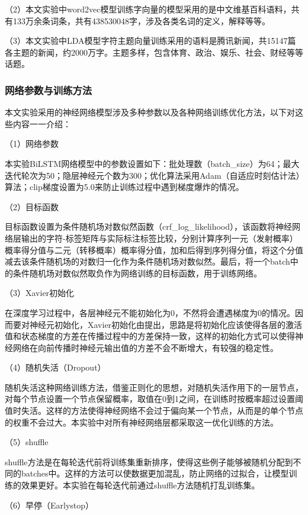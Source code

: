 \documentclass[winfonts,master,oneside,nobackinfo]{njuthesis}
\begin{document}
（2）本文实验中word2vec模型训练字向量的模型采用的是中文维基百科语料，共有133万余条词条，共有438530048字，涉及各类名词的定义，解释等等。

（3）本文实验中LDA模型字符主题向量训练采用的语料是腾讯新闻，共15147篇各主题的新闻，约2000万字。主题多样，包含体育、政治、娱乐、社会、财经等等话题。

\subsubsection{网络参数与训练方法}

本文实验采用的神经网络模型涉及多种参数以及各种网络训练优化方法，以下对这些内容一一介绍：

（1）网络参数

本实验BiLSTM网络模型中的参数设置如下：批处理数（batch\_size）为64；最大迭代轮次为50；隐层神经元个数为300；优化算法采用Adam\cite{Adam}（自适应时刻估计法）算法；clip梯度设置为5.0来防止训练过程中遇到梯度爆炸的情况。

（2）目标函数

目标函数设置为条件随机场对数似然函数（crf\_log\_likelihood），该函数将神经网络层输出的字符-标签矩阵与实际标注标签比较，分别计算序列一元（发射概率）概率得分值与二元（转移概率）概率得分值，加和后得到序列得分值，将这个分值减去该条件随机场的对数归一化作为条件随机场对数似然。最后，将一个batch中的条件随机场对数似然取负作为网络训练的目标函数，用于训练网络。

（3）Xavier初始化

在深度学习过程中，各层神经元不能初始化为0，不然将会遭遇梯度为0的情况。因而要对神经元初始化，Xavier初始化由\cite{Glorot}提出，思路是将初始化应该使得各层的激活值和状态梯度的方差在传播过程中的方差保持一致，这样的初始化方式可以使得神经网络在向前传播时神经元输出值的方差不会不断增大，有较强的稳定性。

（4）随机失活（Dropout）

随机失活这种网络训练方法，借鉴正则化的思想，对随机失活作用下的一层节点，对每个节点设置一个节点保留概率，取值在0到1之间，在训练时按概率超过设置阈值时失活。这样的方法使得神经网络不会过于偏向某一个节点，从而是的单个节点的权重不会过大。本实验中对所有神经网络层都采取这一优化训练的方法。

（5）shuffle

shuffle方法是在每轮迭代前将训练集重新排序，使得这些例子能够被随机分配到不同的batches中。这样的方法可以使数据更加混乱，防止网络的过拟合，让模型训练的效果更好。本实验在每轮迭代前通过shuffle方法随机打乱训练集。

（6）早停（Earlystop）
\end{document}
